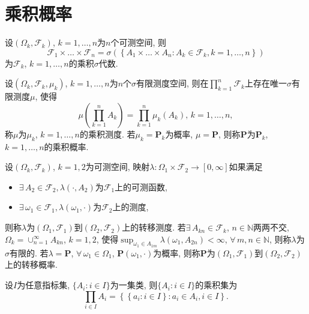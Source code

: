 \chapter{乘积概率}

\def\F{\mathcal{F}}
\def\s{$(\Omega,\F,\mu)$}
\def\R{\mathbb{R}}
\def\P{\mathbf{P}}
\begin{definition}
    设$(\Omega_k,\F_k)$, $k=1,\dots,n$为$n$个可测空间, 则
    \begin{equation}
        \F_1\times\dots\times\F_n=\sigma(\left\{A_1\times\dots\times A_n\colon A_k\in\F_k,k=1,\dots,n\right\})
    \end{equation}
    为$\F_k$, $k=1,\dots,n$的乘积$\sigma$代数.
\end{definition}

\begin{definition}
    设$(\Omega_k,\F_k,\mu_k)$, $k=1,\dots,n$为$n$个$\sigma$有限测度空间, 则在$\prod_{k=1}^{n}\F_k$上存在唯一$\sigma$有限测度$\mu$, 使得
    \begin{equation}
        \mu(\prod_{k=1}^{n}A_k)=\prod_{k=1}^{n}\mu_k(A_k),\,k=1,\dots,n,
    \end{equation}
    称$\mu$为$\mu_k$, $k=1,\dots,n$的乘积测度. 若$\mu_k=\P_k$为概率, $\mu=\P$, 则称$\P$为$\P_k$, $k=1,\dots,n$的乘积概率.
\end{definition}

\begin{definition}
    设$(\Omega_k,\F_k)$, $k=1,2$为可测空间, 映射$\lambda\colon \Omega_1\times\F_2\to[0,\infty]$如果满足
    \begin{itemize}
        \item $\exists\, A_2\in\F_2, \lambda(\cdot,A_2)$为$\F_1$上的可测函数,
        \item $\exists\, \omega_1\in\F_1, \lambda(\omega_1,\cdot)$为$\F_2$上的测度,
    \end{itemize}
    则称$\lambda$为$(\Omega_1,\F_1)$到$(\Omega_2,\F_2)$上的转移测度. 若$\exists\, A_{kn}\in\F_k$, $n\in\mathbb{N}$两两不交, $\Omega_k=\cup_{n=1}^{\infty}A_{kn}$, $k=1,2$, 使得$\sup_{\omega_1\in A_{1m}}\lambda(\omega_1,A_{2n})<\infty$, $\forall\, m,n\in\mathbb{N}$, 则称$\lambda$为$\sigma$有限的. 若$\lambda=\P$, $\forall\, \omega_1\in\Omega_1$, $\P(\omega_1,\cdot)$为概率, 则称$\P$为$(\Omega_1,\F_1)$到$(\Omega_2,\F_2)$上的转移概率.
\end{definition}

\begin{definition}
    设$I$为任意指标集, $\{A_i\colon i\in I\}$为一集类, 则$\{A_i\colon i\in I\}$的乘积集为
    \begin{equation}
        \prod_{i\in I}A_i=\left\{\left\{a_{i}\colon i\in I\right\}\colon a_{i}\in A_i,i\in I\right\}.
    \end{equation}
\end{definition}

